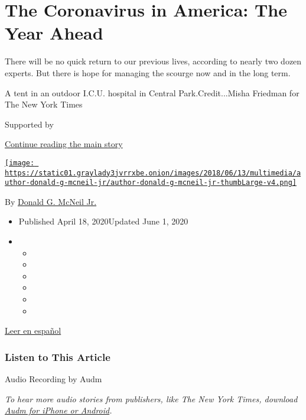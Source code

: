 \hypertarget{the-coronavirus-in-america-the-year-ahead}{%
\section{The Coronavirus in America: The Year
Ahead}\label{the-coronavirus-in-america-the-year-ahead}}

There will be no quick return to our previous lives, according to nearly
two dozen experts. But there is hope for managing the scourge now and in
the long term.

A tent in an outdoor I.C.U. hospital in Central Park.Credit...Misha
Friedman for The New York Times

Supported by

\protect\hyperlink{after-sponsor}{Continue reading the main story}

\href{https://www.nytimes3xbfgragh.onion/by/donald-g-mcneil-jr}{\texttt{[image: https://static01.graylady3jvrrxbe.onion/images/2018/06/13/multimedia/author-donald-g-mcneil-jr/author-donald-g-mcneil-jr-thumbLarge-v4.png]}}

By
\href{https://www.nytimes3xbfgragh.onion/by/donald-g-mcneil-jr}{Donald
G. McNeil Jr.}

\begin{itemize}
\item
  Published April 18, 2020Updated June 1, 2020
\item
  \begin{itemize}
  \item
  \item
  \item
  \item
  \item
  \item
  \end{itemize}
\end{itemize}

\href{https://www.nytimes3xbfgragh.onion/es/2020/04/21/espanol/ciencia-y-tecnologia/coronavirus-futuro.html}{Leer
en español}

\hypertarget{listen-to-this-article}{%
\subsubsection{Listen to This Article}\label{listen-to-this-article}}

Audio Recording by Audm

\emph{To hear more audio stories from publishers, like The New York
Times, download}
\href{https://www.audm.com/?utm_source=nyt\&utm_medium=embed\&utm_campaign=coronavirus_year_ahead}{\emph{Audm
for iPhone or Android}}\emph{.}

